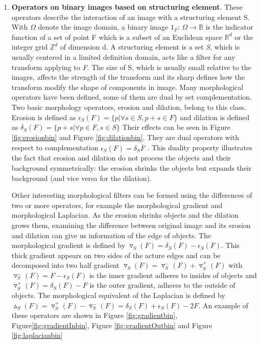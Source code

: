 \begin{enumerate}
\item \textbf{Operators on binary images based on structuring element}. These operators describe the interaction of an image with a structuring element S. With $\Omega$ denote the image domain, a binary image $1_F$: $ \Omega \rightarrow \mathbb{B} $ is the indicator function of a set of point F which is a subset of an Euclidean space $ \mathbb{R}^d $ or the integer grid $\mathbb{Z}^d$ of dimension d. A structuring element is a set \textit{S}, which is usually centered in a limited definition domain, acts like a filter for any transform applying to \textit{F}. The size of S, which is usually small relative to the images, affects the strength of the transform and its sharp defines how the transform modify the shape of components in image. Many morphological operators have been defined, some of them are dual by set complementation. Two basic morphology operators, erosion and dilation, belong to this class. Erosion is defined as $ \epsilon_S (F) = \lbrace p  \vert  \forall s \in S, p + s \in F\rbrace $  and dilation is defined as $ \delta_S (F) = \lbrace p+s  \vert  \forall p \in F, s \in S\rbrace $ Their effects can be seen in Figure \ref{fig:erosionbin} and  Figure \ref{fig:dilationbin}. They are dual operators with respect to complementation $ \epsilon_S (F) = \overline{\delta_{S} \overline{F}} $ . This duality property illustrates the fact that erosion and dilation do not process the objects and their background symmetrically: the erosion shrinks the objects but expands their background (and vice versa for the dilation).
\par Other interesting morphological filters can be formed using the differences of two or more operators, for example the morphological gradient and morphological Laplacian. As the erosion shrinks objects and the dilation grows them, examining the difference between original image and its erosion and dilation can give us information of the edge of objects. The morphological gradient is defined by $\triangledown_S (F) = \delta_S (F) - \epsilon_S (F) $. This thick gradient appears on two sides of the acture edges and can be decomposed into two half gradient $\triangledown_S (F) = \triangledown_S ^- (F) + \triangledown_S ^+ (F)$ with $ \triangledown_S ^- (F) = F - \epsilon_S (F)$ is the inner gradient adheres to insides of objects and $ \triangledown_S ^+ (F) =\delta_S (F) - F$ is the outer gradient, adheres to the outside of objects. The morphological equivalent of the Laplacian is defined by $\vartriangle_S (F) =\triangledown_S ^+ (F) - \triangledown_S ^- (F)=\delta_S (F)+\epsilon_S (F) - 2F$. An example of these operators are shown in Figure \ref{fig:gradientbin}, Figure\ref{fig:gradientInbin}, Figure \ref{fig:gradientOutbin} and Figure \ref{fig:laplacianbin}


\end{enumerate}
